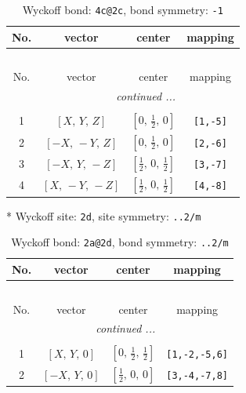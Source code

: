 \documentclass[fleqn,8pt]{jsarticle}
\begin{document}
\begin{longtable}{cccc}
\caption{Wyckoff bond: {\tt 4c@2c}, bond symmetry: {\tt -1}}
 \\
 \hline \hline
No. & vector & center & mapping \\ \hline \endfirsthead

\multicolumn{3}{l}{\tablename\ \thetable{}} \\
 \hline \hline
No. & vector & center & mapping \\ \hline \endhead

 \hline \hline
\multicolumn{3}{r}{\footnotesize\it continued ...} \\ \endfoot

 \hline \hline
\multicolumn{3}{r}{} \\ \endlastfoot

1 & $\left[ X,\, Y,\, Z \right]$ & $\left[ 0,\, \frac{1}{2},\, 0 \right]$ & {\tt [1,-5]} \\ \hline
2 & $\left[ - X,\, - Y,\, Z \right]$ & $\left[ 0,\, \frac{1}{2},\, 0 \right]$ & {\tt [2,-6]} \\ \hline
3 & $\left[ - X,\, Y,\, - Z \right]$ & $\left[ \frac{1}{2},\, 0,\, \frac{1}{2} \right]$ & {\tt [3,-7]} \\ \hline
4 & $\left[ X,\, - Y,\, - Z \right]$ & $\left[ \frac{1}{2},\, 0,\, \frac{1}{2} \right]$ & {\tt [4,-8]} \\
\end{longtable}
* Wyckoff site: {\tt 2d}, site symmetry: {\tt ..2/m}
\renewcommand{\arraystretch}{1.2}
\begin{longtable}{cccc}
\caption{Wyckoff bond: {\tt 2a@2d}, bond symmetry: {\tt ..2/m}}
 \\
 \hline \hline
No. & vector & center & mapping \\ \hline \endfirsthead

\multicolumn{3}{l}{\tablename\ \thetable{}} \\
 \hline \hline
No. & vector & center & mapping \\ \hline \endhead

 \hline \hline
\multicolumn{3}{r}{\footnotesize\it continued ...} \\ \endfoot

 \hline \hline
\multicolumn{3}{r}{} \\ \endlastfoot

1 & $\left[ X,\, Y,\, 0 \right]$ & $\left[ 0,\, \frac{1}{2},\, \frac{1}{2} \right]$ & {\tt [1,-2,-5,6]} \\ \hline
2 & $\left[ - X,\, Y,\, 0 \right]$ & $\left[ \frac{1}{2},\, 0,\, 0 \right]$ & {\tt [3,-4,-7,8]} \\
\end{longtable}
\end{document}
